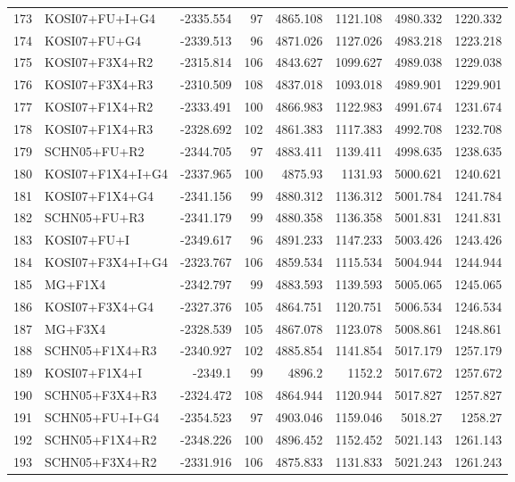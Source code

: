 \begin{longtable}{clrrrrrr}
	173 & KOSI07+FU+I+G4 & -2335.554 & 97 & 4865.108 & 1121.108 & 4980.332 & 1220.332 \\ 
	174 & KOSI07+FU+G4 & -2339.513 & 96 & 4871.026 & 1127.026 & 4983.218 & 1223.218 \\ 
	175 & KOSI07+F3X4+R2 & -2315.814 & 106 & 4843.627 & 1099.627 & 4989.038 & 1229.038 \\ 
	176 & KOSI07+F3X4+R3 & -2310.509 & 108 & 4837.018 & 1093.018 & 4989.901 & 1229.901 \\ 
	177 & KOSI07+F1X4+R2 & -2333.491 & 100 & 4866.983 & 1122.983 & 4991.674 & 1231.674 \\ 
	178 & KOSI07+F1X4+R3 & -2328.692 & 102 & 4861.383 & 1117.383 & 4992.708 & 1232.708 \\ 
	179 & SCHN05+FU+R2 & -2344.705 & 97 & 4883.411 & 1139.411 & 4998.635 & 1238.635 \\ 
	180 & KOSI07+F1X4+I+G4 & -2337.965 & 100 & 4875.93 & 1131.93 & 5000.621 & 1240.621 \\ 
	181 & KOSI07+F1X4+G4 & -2341.156 & 99 & 4880.312 & 1136.312 & 5001.784 & 1241.784 \\ 
	182 & SCHN05+FU+R3 & -2341.179 & 99 & 4880.358 & 1136.358 & 5001.831 & 1241.831 \\ 
	183 & KOSI07+FU+I & -2349.617 & 96 & 4891.233 & 1147.233 & 5003.426 & 1243.426 \\ 
	184 & KOSI07+F3X4+I+G4 & -2323.767 & 106 & 4859.534 & 1115.534 & 5004.944 & 1244.944 \\ 
	185 & MG+F1X4 & -2342.797 & 99 & 4883.593 & 1139.593 & 5005.065 & 1245.065 \\ 
	186 & KOSI07+F3X4+G4 & -2327.376 & 105 & 4864.751 & 1120.751 & 5006.534 & 1246.534 \\ 
	187 & MG+F3X4 & -2328.539 & 105 & 4867.078 & 1123.078 & 5008.861 & 1248.861 \\ 
	188 & SCHN05+F1X4+R3 & -2340.927 & 102 & 4885.854 & 1141.854 & 5017.179 & 1257.179 \\ 
	189 & KOSI07+F1X4+I & -2349.1 & 99 & 4896.2 & 1152.2 & 5017.672 & 1257.672 \\ 
	190 & SCHN05+F3X4+R3 & -2324.472 & 108 & 4864.944 & 1120.944 & 5017.827 & 1257.827 \\ 
	191 & SCHN05+FU+I+G4 & -2354.523 & 97 & 4903.046 & 1159.046 & 5018.27 & 1258.27 \\ 
	192 & SCHN05+F1X4+R2 & -2348.226 & 100 & 4896.452 & 1152.452 & 5021.143 & 1261.143 \\ 
	193 & SCHN05+F3X4+R2 & -2331.916 & 106 & 4875.833 & 1131.833 & 5021.243 & 1261.243 \\ 

\end{longtable}
